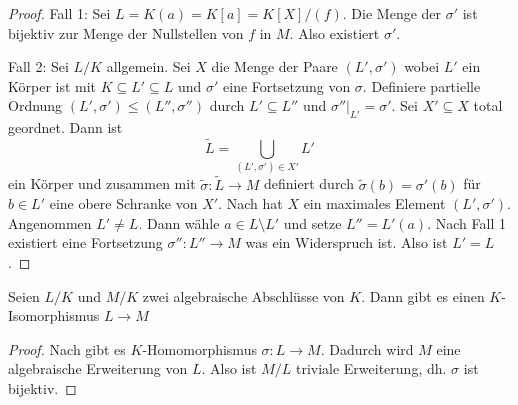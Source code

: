 \begin{proof}
    Fall 1: Sei \(L=K(a)=K[a]=K[X]/(f)\). Die Menge der \(\sigma'\) ist bijektiv zur Menge der Nullstellen von \(f\) in \(M\). Also existiert \(\sigma'\).
    
    Fall 2: Sei \(L/K\) allgemein. Sei \(X\) die Menge der Paare \((L',\sigma')\) wobei \(L'\) ein Körper ist mit \(K\subseteq L'\subseteq L\) und \(\sigma'\) eine Fortsetzung von \(\sigma\).
    Definiere partielle Ordnung \((L',\sigma')\leq (L'',\sigma'')\) durch \(L'\subseteq L''\) und \(\sigma''|_{L'}=\sigma'\).
    Sei \(X'\subseteq X\) total geordnet. Dann ist \[\tilde L=\bigcup\limits_{(L',\sigma')\in X'}L'\] ein Körper und zusammen mit \(\tilde\sigma\colon\tilde L\to M\) definiert durch \(\tilde\sigma(b)=\sigma'(b)\) für \(b\in L'\) eine obere Schranke von \(X'\).
    Nach  hat \(X\) ein maximales Element \((L',\sigma')\).
    Angenommen \(L'\neq L\). Dann wähle \(a\in L\setminus L'\) und setze \(L''=L'(a)\). Nach Fall 1 existiert eine Fortsetzung \(\sigma''\colon L''\to M\) was ein Widerspruch ist. Also ist \(L'=L\). 
\end{proof}
\begin{Kor}
    Seien \(L/K\) und \(M/K\) zwei algebraische Abschlüsse von \(K\). Dann gibt es einen \(K\)-Isomorphismus \(L\to M\)
\end{Kor}
\begin{proof}
    Nach  gibt es \(K\)-Homomorphismus \(\sigma\colon L\to M\). Dadurch wird \(M\) eine algebraische Erweiterung von \(L\). Also ist \(M/L\) triviale Erweiterung, dh. \(\sigma\) ist bijektiv.
\end{proof}
